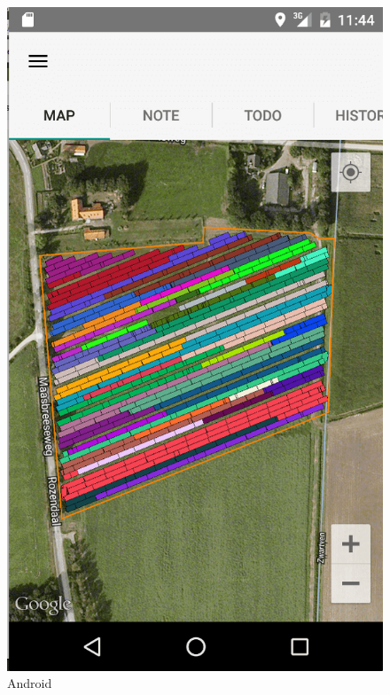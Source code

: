 \documentclass[12pt]{article}
\begin{document}
\begin{figure}[ht]
	\includegraphics[width=\linewidth, height=0.4\textheight, keepaspectratio=true, frame]{screenshots/GruttoAnd.png}
	\caption{Android}
	\endminipage\hfill
\end{figure}
\clearpage
\end{document}
